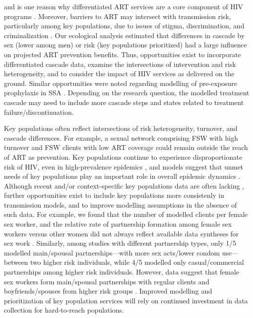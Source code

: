 and is one reason why differentiated ART services are a core component of HIV programs
\cite{Chikwari2018,Ehrenkranz2019}.
Moreover, barriers to ART may intersect with transmission risk, particularly among key populations,
due to issues of stigma, discrimination, and criminalization \cite{Ortblad2019,Baral2019}.
Our ecological analysis estimated that
differences in cascade by sex (lower among men) or risk (key populations prioritized)
had a large influence on projected ART prevention benefits.
Thus, opportunities exist to incorporate differentiated cascade data,
examine the intersections of intervention and risk heterogeneity, and
to consider the impact of HIV services as delivered on the ground.
Similar opportunities were noted regarding modelling of pre-exposure prophylaxis in SSA \cite{Case2019}.
Depending on the research question, the modelled treatment cascade may need
to include more cascade steps and states related to treatment failure/discontinuation.
\par
Key populations often reflect intersections of risk heterogeneity, turnover, and cascade differences.
For example, a sexual network comprising FSW with high turnover and FSW clients with low ART coverage
could remain outside the reach of ART as prevention.
Key populations continue to experience disproportionate risk of HIV,
even in high-prevalence epidemics \cite{Baral2012,Beyrer2012},
and models suggest that unmet needs of key populations
play an important role in overall epidemic dynamics \cite{Bekker2015,Stone2021}.
Although recent and/or context-specific key populations data are often lacking \cite{Rao2018},
further opportunities exist to include key populations more consistenly in transmission models,
and to improve modelling assumptions in the absence of such data.
For example, we found that the number of modelled clients per female sex worker, and
the relative rate of partnership formation among female sex workers versus other women
did not always reflect available data syntheses for sex work \cite{Watts2010,Scorgie2012}.
Similarly, among studies with different partnership types, only 1/5 modelled
main/spousal partnerships---with more sex acts/lower condom use---between two higher risk individuals,
while 4/5 modelled only casual/commercial partnerships among higher risk individuals.
However, data suggest that female sex workers form main/spousal partnerships
with regular clients and boyfriends/spouses from higher risk groups \cite{Scorgie2012}.
Improved modelling and prioritization of key population services
will rely on continued investment in data collection for hard-to-reach populations.
